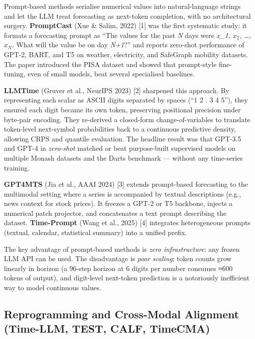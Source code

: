 Prompt-based methods serialise numerical values into natural-language strings and let the LLM treat forecasting as next-token completion, with no architectural surgery. \textbf{PromptCast} (Xue \& Salim, 2022) {[}1{]} was the first systematic study: it formats a forecasting prompt as ``The values for the past \emph{N} days were \emph{x\_1, \(x_2\), \ldots, \(x_N\)}. What will the value be on day \emph{N+1}?'' and reports zero-shot performance of GPT-2, BART, and T5 on weather, electricity, and SafeGraph mobility datasets. The paper introduced the PISA dataset and showed that prompt-style fine-tuning, even of small models, beat several specialised baselines.

\textbf{LLMTime} (Gruver et al., NeurIPS 2023) {[}2{]} sharpened this approach. By representing each scalar as ASCII digits separated by spaces (``1 2 . 3 4 5''), they ensured each digit became its own token, preserving positional precision under byte-pair encoding. They re-derived a closed-form change-of-variables to translate token-level next-symbol probabilities back to a continuous predictive density, allowing CRPS and quantile evaluation. The headline result was that GPT-3.5 and GPT-4 in \emph{zero-shot} matched or beat purpose-built supervised models on multiple Monash datasets and the Darts benchmark --- without any time-series training.

\textbf{GPT4MTS} (Jia et al., AAAI 2024) {[}3{]} extends prompt-based forecasting to the multimodal setting where a series is accompanied by textual descriptions (e.g., news context for stock prices). It freezes a GPT-2 or T5 backbone, injects a numerical patch projector, and concatenates a text prompt describing the dataset. \textbf{Time-Prompt} (Wang et al., 2025) {[}4{]} integrates heterogeneous prompts (textual, calendar, statistical summary) into a unified prefix.

The key advantage of prompt-based methods is \emph{zero infrastructure}: any frozen LLM API can be used. The disadvantage is \emph{poor scaling}: token counts grow linearly in horizon (a 96-step horizon at 6 digits per number consumes ≈600 tokens of output), and digit-level next-token prediction is a notoriously inefficient way to model continuous values.

\subsection{Reprogramming and Cross-Modal Alignment (Time-LLM, TEST, CALF, TimeCMA)}\label{reprogramming-and-cross-modal-alignment-time-llm-test-calf-timecma}

